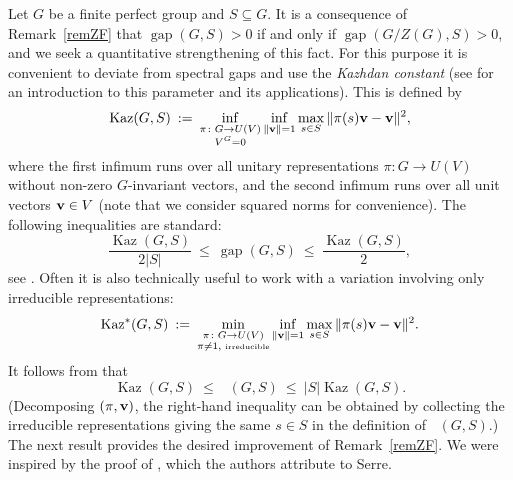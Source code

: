 \documentclass[11pt,reqno]{amsart}
\numberwithin{equation}{section}
\theoremstyle{definition}
\theoremstyle{remark}
\newcommand{\Kaz}{\mathop{\mathrm{Kaz}}}
\newcommand{\Kazz}{\mathop{\mathrm{Kaz^*}}}
\newcommand{\gap}{\mathop{\mathrm{gap}}}
\begin{document}
Let $G$ be a finite perfect group and $S \subseteq G$.
It is a consequence of Remark~\ref{remZF}
that $\gap(G,S) >0$ if and only if $\gap(G/Z(G),S) >0$,
and we seek a quantitative strengthening of this fact.
For this purpose it is convenient to deviate from spectral gaps and use the \emph{Kazhdan constant}
(see \cite{BHV08} for an introduction to this parameter and its applications).
This is defined by
$$ \Kaz(G,S) \> := \> \inf_{\substack{\pi \colon G \to U(V) \\ V^G =0}} 
\inf_{\| {\bf v} \| =1} \max_{s \in S}  \| \pi(s) {\bf v} - {\bf v} \|^2 , $$
where the first infimum runs over all unitary representations $\pi \colon G \to U(V)$ without
non-zero $G$-invariant vectors, and the second infimum runs over all unit vectors ${\bf v} \in V$
(note that we consider squared norms for convenience).
The following inequalities are standard:
$$ \frac{\Kaz(G,S)}{2|S|} \> \leq \> \gap(G,S) \> \leq \> \frac{\Kaz(G,S)}{2} , $$
see \cite[Proposition~III(2)]{HRV93}.
Often it is also technically useful to work with a variation involving only irreducible representations:
$$ \Kazz(G,S) \> := \> \min_{\substack{\pi \colon G \to U(V) \\ \pi \neq 1, \text{ \tiny{irreducible}}}} 
\inf_{\| {\bf v} \| =1} \max_{s \in S}  \| \pi(s) {\bf v} - {\bf v} \|^2 . $$
It follows from \cite[Proposition~III(1)]{HRV93} that
$$ \Kaz(G,S) \> \leq \> \Kazz(G,S) \> \leq \> |S| \Kaz(G,S) . $$
(Decomposing $(\pi,{\bf v})$, the right-hand inequality can be obtained
by collecting the irreducible representations giving the same $s \in S$ in the definition of $\Kazz(G,S)$.)
The next result provides the desired improvement of Remark~\ref{remZF}.
We were inspired by the proof of \cite[Lemma~1.7.10]{BHV08},
which the authors attribute to Serre.
\end{document}
